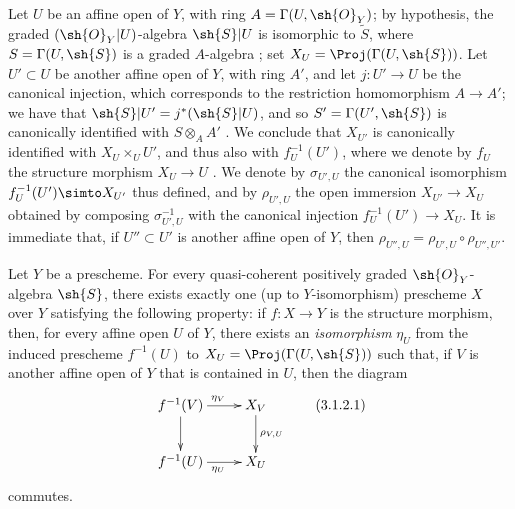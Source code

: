 \begin{env}[3.1.1]
Let $U$ be an affine open of $Y$, with ring $A=\Gamma(U,\sh{O}_Y)$;
by hypothesis, the graded $(\sh{O}_Y|U)$-algebra $\sh{S}|U$ is isomorphic to $\widetilde{S}$, where $S=\Gamma(U,\sh{S})$ is a graded $A$-algebra ;
set $X_U=\Proj(\Gamma(U,\sh{S}))$.
Let $U'\subset U$ be another affine open of $Y$, with ring $A'$, and let $j:U'\to U$ be the canonical injection, which corresponds to the restriction homomorphism $A\to A'$;
we have that $\sh{S}|U'=j^*(\sh{S}|U)$, and so $S'=\Gamma(U',\sh{S})$ is canonically identified with $S\otimes_AA'$ .
We conclude  that $X_{U'}$ is canonically identified with $X_U\times_U U'$, and thus also with $f_U^{-1}(U')$, where we denote by $f_U$ the structure morphism $X_U\to U$ .
We denote by $\sigma_{U',U}$ the canonical isomorphism $f_U^{-1}(U')\simto X_{U'}$ thus defined, and by $\rho_{U',U}$ the open immersion $X_{U'}\to X_U$ obtained by composing $\sigma_{U',U}^{-1}$ with the canonical injection $f_U^{-1}(U')\to X_U$.
It is immediate that, if $U''\subset U'$ is another affine open of $Y$, then $\rho_{U'',U}=\rho_{U',U}\circ\rho_{U'',U'}$.
\end{env}

\begin{proposition}[3.1.2]
\label{II.3.1.2}
Let $Y$ be a prescheme.
For every quasi-coherent positively graded $\sh{O}_Y$-algebra $\sh{S}$, there exists exactly one (up to $Y$-isomorphism) prescheme $X$ over $Y$ satisfying the following property:
if $f:X\to Y$ is the structure morphism, then, for every affine open $U$ of $Y$, there exists an \emph{isomorphism} $\eta_U$ from the induced prescheme $f^{-1}(U)$ to $X_U=\Proj(\Gamma(U,\sh{S}))$ such that, if $V$ is another affine open of $Y$ that is contained in $U$, then the diagram
\[
\label{II.3.1.2.1}
  \xymatrix{
    f^{-1}(V) \ar[r]^{\eta_V} \ar[d]
    & X_V \ar[d]^{\rho_{V,U}}
  \\f^{-1}(U) \ar[r]_{\eta_U}
    & X_U
  }
\tag{3.1.2.1}
\]
commutes.
\end{proposition}

